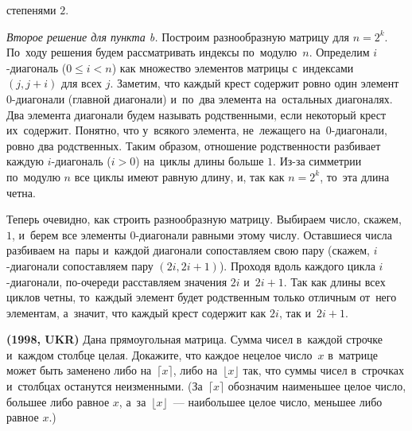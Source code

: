 степенями $2$.
\par
\emph{Второе решение для пункта b.}
Построим разнообразную матрицу для $n = 2^k$.
По~ходу решения будем рассматривать индексы по~модулю~$n$.
Определим $i$-диагональ ($0 \leq i < n$) как множество элементов матрицы
с~индексами $(j, j + i)$ для всех $j$.
Заметим, что каждый крест содержит ровно один элемент $0$-диагонали
(главной диагонали) и~по~два элемента на~остальных диагоналях.
Два элемента диагонали будем называть родственными, если некоторый крест
их~содержит.
Понятно, что у~всякого элемента, не~лежащего на~$0$-диагонали, ровно два
родственных.
Таким образом, отношение родственности разбивает каждую $i$-диагональ ($i > 0$)
на~циклы длины больше $1$.
Из-за симметрии по~модулю $n$ все циклы имеют равную длину, и, так как
$n = 2^k$, то~эта длина четна.
\par
Теперь очевидно, как строить разнообразную матрицу.
Выбираем число, скажем, $1$, и~берем все элементы $0$-диагонали равными этому
числу.
Оставшиеся числа разбиваем на~пары и~каждой диагонали сопоставляем свою пару
(скажем, $i$-диагонали сопоставляем пару $(2 i, 2 i + 1)$).
Проходя вдоль каждого цикла $i$-диагонали, по-очереди расставляем значения
$2 i$ и~$2 i + 1$.
Так как длины всех циклов четны, то~каждый элемент будет родственным только
отличным от~него элементам, а~значит, что каждый крест содержит как $2 i$, так
и~$2 i + 1$.
\fi %

\begin{problems}

\item\textbf{(1998, UKR)}
Дана прямоугольная матрица.
Сумма чисел в~каждой строчке и~каждом столбце целая.
Докажите, что каждое нецелое число~$x$ в~матрице может быть заменено либо
на~$\lceil x \rceil$, либо на~$\lfloor x \rfloor$ так, что суммы чисел
в~строчках и~столбцах останутся неизменными.
(За~$\lceil x \rceil$ обозначим наименьшее целое число,
большее либо равное $x$,
а~за~$\lfloor x \rfloor$~--- наибольшее целое число,
меньшее либо равное $x$.)

\end{problems}

